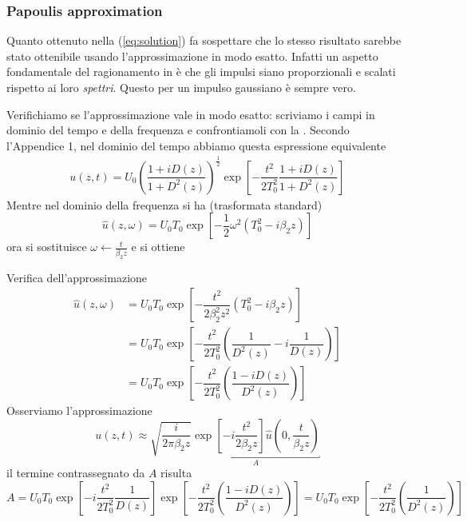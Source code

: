 \documentclass[8pt]{beamer} %
\begin{document}
\begin{frame}
    \frametitle{Papoulis approximation}
    Quanto ottenuto nella (\ref{eq:solution}) fa sospettare che lo stesso risultato sarebbe stato ottenibile usando l'approssimazione in modo esatto. Infatti un aspetto fondamentale del ragionamento in \cite{Dar_2013} è che gli impulsi siano proporzionali e scalati rispetto ai loro \textit{spettri}. Questo per un impulso gaussiano è sempre vero.

    \vspace{20pt}
    Verifichiamo se l'approssimazione vale in modo esatto: scriviamo i campi in dominio del tempo e della frequenza e confrontiamoli con la \cite[eq. 10]{Dar_2013}. Secondo l'Appendice 1, nel dominio del tempo abbiamo questa espressione equivalente
    \begin{align}
        u(z, t) = U_0 \left(\dfrac{1+iD(z)}{1+D^2(z)}\right)^{\frac{1}{2}} \exp\left[-\dfrac{t^2}{2T_0^2} \dfrac{1+iD(z)}{1+D^2(z)}\right]
    \end{align}
    Mentre nel dominio della frequenza si ha (trasformata standard)
    \begin{equation}
        \hat{u}(z, \omega) = U_0 T_0 \exp\left[-\dfrac{1}{2} \omega^2 (T_0^2 - i\beta_2z)\right]
    \end{equation}
    ora si sostituisce $\omega \leftarrow \frac{t}{\beta_2z}$ e si ottiene
\end{frame}

\begin{frame}{Verifica dell'approssimazione}
    \begin{align*}
        \hat{u}(z, \omega) & = U_0 T_0 \exp\left[-\dfrac{t^2}{2\beta_2^2 z^2} (T_0^2 - i\beta_2z)\right]                       \\
                           & = U_0 T_0 \exp\left[-\dfrac{t^2}{2T_0^2} \left(\dfrac{1}{D^2(z)} - i\dfrac{1}{D(z)}\right)\right] \\
                           & = U_0 T_0 \exp\left[-\dfrac{t^2}{2T_0^2} \left(\dfrac{1-iD(z)}{D^2(z)}\right)\right]
    \end{align*}
    Osserviamo l'approssimazione
    \begin{equation}
        u(z, t) \approx \sqrt{\frac{i}{2\pi \beta_2 z}} \underbracket{\exp\left[-i\frac{t^2}{2 \beta_2 z}\right] \hat{u}\left(0, \frac{t}{\beta_2 z}\right)}_{A}
    \end{equation}
    il termine contrassegnato da $A$ risulta
    \begin{equation}
        A = U_0 T_0 \exp\left[-i\frac{t^2}{2 T_0^2} \dfrac{1}{D(z)}\right]\exp\left[-\dfrac{t^2}{2T_0^2} \left(\dfrac{1-iD(z)}{D^2(z)}\right)\right] = U_0 T_0 \exp\left[-\dfrac{t^2}{2T_0^2} \left(\dfrac{1}{D^2(z)}\right)\right]
    \end{equation}
\end{frame}
\end{document}
